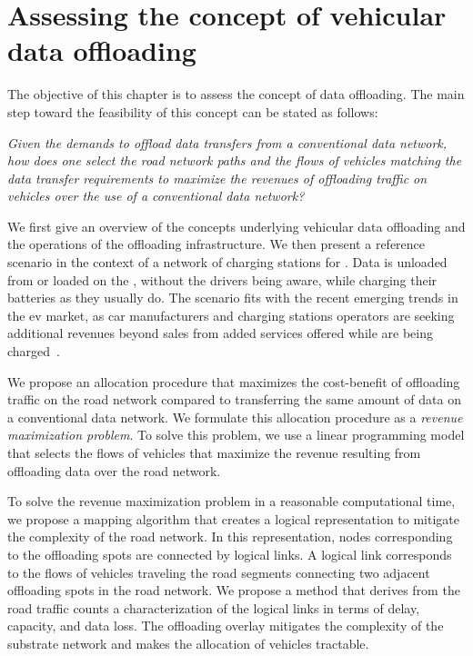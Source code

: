 \chapter{Assessing the concept of vehicular data offloading}
\label{cha:feasibility-study}

The objective of this chapter is to assess the concept of data offloading. The main step toward the feasibility of this concept can be stated as follows: 

\begin{displayquote}
\textit{Given the demands to offload data transfers from a conventional data network, how does one select the road network paths and the flows of vehicles matching the data transfer requirements to maximize the revenues of offloading traffic on vehicles over the use of a conventional data network?}
\end{displayquote}


We first give an overview of the concepts underlying vehicular data offloading and the operations of the offloading infrastructure. We then present a reference scenario in the context of a network of charging stations for . Data is unloaded from or loaded on the , without the drivers being aware, while charging their batteries as they usually do. The scenario fits with the recent emerging trends in the \acrshort{ev} market, as car manufacturers and charging stations operators are seeking additional revenues beyond sales from added services offered while  are being charged~\cite{report2014ChargingTrends}.

We propose an allocation procedure that maximizes the cost-benefit of offloading traffic on the road network compared to transferring the same amount of data on a conventional data network. We formulate this allocation procedure as a \textit{revenue maximization problem}. To solve this problem, we use a linear programming model that selects the flows of vehicles that maximize the revenue resulting from offloading data over the road network. 

To solve the revenue maximization problem in a reasonable computational time, we propose a mapping algorithm that creates a logical representation to mitigate the complexity of the road network. In this representation, nodes corresponding to the offloading spots are connected by logical links. A logical link corresponds to the flows of vehicles traveling the road segments connecting two adjacent offloading spots in the road network. We propose a method that derives from the road traffic counts a characterization of the logical links in terms of delay, capacity, and data loss. The offloading overlay mitigates the complexity of the substrate network and makes the allocation of vehicles tractable.


